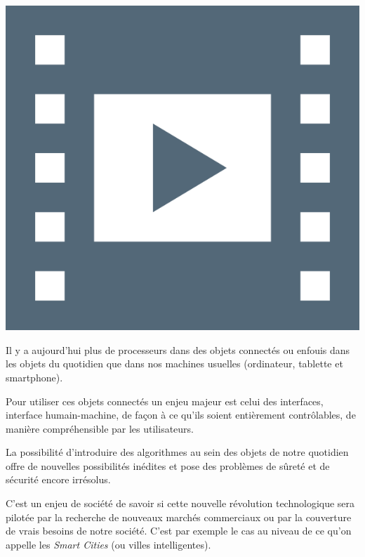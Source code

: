 \begin{marginvideo}
	[\label{vid:VIII.5}Objets connectés.]%
	\href{https://www.youtube.com/watch?v=DOECi_ZKaYI}%
	  {\includegraphics[width=\marginparwidth]{./Images/Pictograms/film-strip-dark-electric-blue.png}}%
\end{marginvideo}

\begin{jazzitemize}
\item Il y a aujourd'hui plus de processeurs dans des objets connectés ou enfouis dans les objets du quotidien que dans nos machines usuelles (ordinateur, tablette et smartphone).
\item Pour utiliser ces objets connectés un enjeu majeur est celui des interfaces, interface humain-machine,  de façon à ce qu'ils soient entièrement contrôlables, de manière compréhensible par les utilisateurs.
\item La possibilité d'introduire des algorithmes au sein des objets de notre quotidien offre de nouvelles possibilités inédites et pose des problèmes de sûreté et de sécurité encore irrésolus.
\item C'est un enjeu de société de savoir si cette nouvelle révolution technologique sera pilotée  par la recherche de nouveaux marchés commerciaux ou par la couverture de vrais besoins de notre société. C'est par exemple le cas au niveau de ce qu'on appelle les \textit{Smart Cities} (ou villes intelligentes).
\end{jazzitemize}

